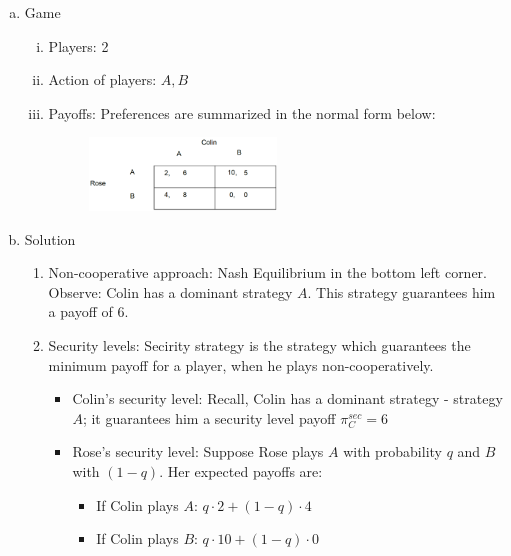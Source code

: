 \begin{enumerate}[a)]
    \item Game
        \begin{enumerate}[(i)]
            \item Players: 2
            \item Action of players: $A,B$
            \item Payoffs: Preferences are summarized in the normal form below:
            \begin{figure}[H]
                \centering
                \includegraphics[width=0.5\textwidth]{Pictures/rose_colin_example.png}
            \end{figure}
        \end{enumerate}
    \item Solution
        \begin{enumerate}[b1)]
            \item Non-cooperative approach:
                Nash Equilibrium in the bottom left corner. Observe:
                Colin has a dominant strategy $A$. This strategy guarantees
                him a payoff of $6$.
            \item Security levels:
                Secirity strategy is the strategy which guarantees the minimum
                payoff for a player, when he plays non-cooperatively.
                \begin{itemize}
                    \item Colin's security level:
                        Recall, Colin has a dominant strategy - strategy $A$;
                        it guarantees him a security level payoff $\pi_C^{sec} = 6$
                    \item Rose's security level:
                        Suppose Rose plays $A$ with probability $q$ and $B$ with
                        $(1-q)$. Her expected payoffs are:
                        \begin{itemize}
                            \item If Colin plays $A$: $q \cdot 2 + (1-q) \cdot 4$
                            \item If Colin plays $B$: $q \cdot 10 + (1-q) \cdot 0$
                        \end{itemize}

\end{itemize}
\end{enumerate}
\end{enumerate}
